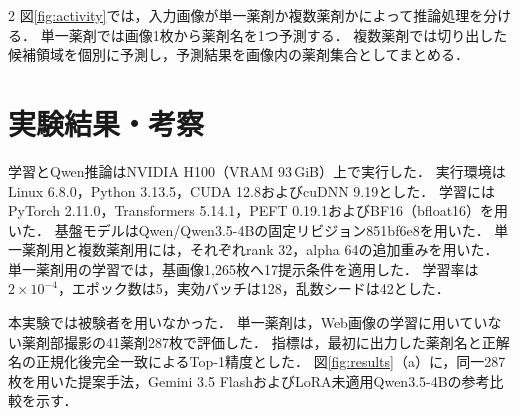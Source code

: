\documentclass[10pt,a4paper]{article}
\begin{document}
\begin{multicols}{2}
図\ref{fig:activity}では，入力画像が単一薬剤か複数薬剤かによって推論処理を分ける．
単一薬剤では画像1枚から薬剤名を1つ予測する．
複数薬剤では切り出した候補領域を個別に予測し，予測結果を画像内の薬剤集合としてまとめる．

\section{実験結果・考察}

学習とQwen推論はNVIDIA H100（VRAM 93\,GiB）上で実行した．
実行環境はLinux 6.8.0，Python 3.13.5，CUDA 12.8およびcuDNN 9.19とした．
学習にはPyTorch 2.11.0，Transformers 5.14.1，PEFT 0.19.1およびBF16（bfloat16）を用いた．
基盤モデルはQwen/Qwen3.5-4Bの固定リビジョン851bf6e8を用いた\cite{qwen35model}．
単一薬剤用と複数薬剤用には，それぞれrank 32，alpha 64の追加重みを用いた．
単一薬剤用の学習では，基画像1,265枚へ17提示条件を適用した．
学習率は$2\times10^{-4}$，エポック数は5，実効バッチは128，乱数シードは42とした．

本実験では被験者を用いなかった．
単一薬剤は，Web画像の学習に用いていない薬剤部撮影の41薬剤287枚で評価した．
指標は，最初に出力した薬剤名と正解名の正規化後完全一致によるTop-1精度とした．
図\ref{fig:results}（a）に，同一287枚を用いた提案手法，Gemini 3.5 FlashおよびLoRA未適用Qwen3.5-4Bの参考比較を示す．


\end{multicols}
\end{document}
